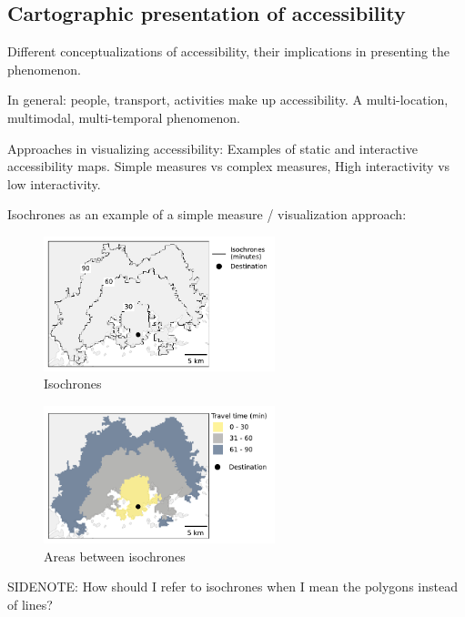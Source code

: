 \subsection{Cartographic presentation of accessibility}

Different conceptualizations of accessibility,
their implications in presenting the phenomenon.

In general: people, transport, activities make up accessibility.
A multi-location, multimodal, multi-temporal phenomenon.

Approaches in visualizing accessibility:
Examples of static and interactive accessibility maps.
Simple measures vs complex measures,
High interactivity vs low interactivity.

Isochrones as an example of a simple measure / visualization approach:

\begin{figure}[H]
	\centering
	\includegraphics[width=0.6\textwidth]{visual/figures/ttm/isochrone_lines.pdf}
	\caption{Isochrones}
	\label{fig:isochrone lines}
\end{figure}

\begin{figure}[H]
	\centering
	\includegraphics[width=0.6\textwidth]{visual/figures/ttm/isochrone_areas.pdf}
	\caption{Areas between isochrones}
	\label{fig:isochrone areas}
\end{figure}

SIDENOTE: How should I refer to isochrones when I mean the polygons instead of lines?



